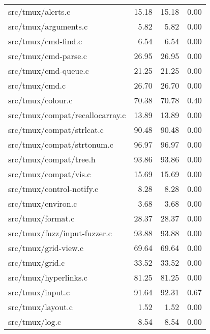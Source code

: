 \begin{table*}[ht]
	\centering
	\scriptsize
	\begin{supertabular}{lrrr}
		src/tmux/alerts.c                  & 15.18 & 15.18 &  0.00 \\
		src/tmux/arguments.c               &  5.82 &  5.82 &  0.00 \\
		src/tmux/cmd-find.c                &  6.54 &  6.54 &  0.00 \\
		src/tmux/cmd-parse.c               & 26.95 & 26.95 &  0.00 \\
		src/tmux/cmd-queue.c               & 21.25 & 21.25 &  0.00 \\
		src/tmux/cmd.c                     & 26.70 & 26.70 &  0.00 \\
		 src/tmux/colour.c                  & 70.38 & 70.78 &  0.40 \\
		src/tmux/compat/recallocarray.c    & 13.89 & 13.89 &  0.00 \\
		src/tmux/compat/strlcat.c          & 90.48 & 90.48 &  0.00 \\
		src/tmux/compat/strtonum.c         & 96.97 & 96.97 &  0.00 \\
		src/tmux/compat/tree.h             & 93.86 & 93.86 &  0.00 \\
		src/tmux/compat/vis.c              & 15.69 & 15.69 &  0.00 \\
		src/tmux/control-notify.c          &  8.28 &  8.28 &  0.00 \\
		src/tmux/environ.c                 &  3.68 &  3.68 &  0.00 \\
		src/tmux/format.c                  & 28.37 & 28.37 &  0.00 \\
		src/tmux/fuzz/input-fuzzer.c       & 93.88 & 93.88 &  0.00 \\
		src/tmux/grid-view.c               & 69.64 & 69.64 &  0.00 \\
		src/tmux/grid.c                    & 33.52 & 33.52 &  0.00 \\
		src/tmux/hyperlinks.c              & 81.25 & 81.25 &  0.00 \\
		 src/tmux/input.c                   & 91.64 & 92.31 &  0.67 \\
		src/tmux/layout.c                  &  1.52 &  1.52 &  0.00 \\
		src/tmux/log.c                     &  8.54 &  8.54 &  0.00 \\

\end{supertabular}
\end{table*}

